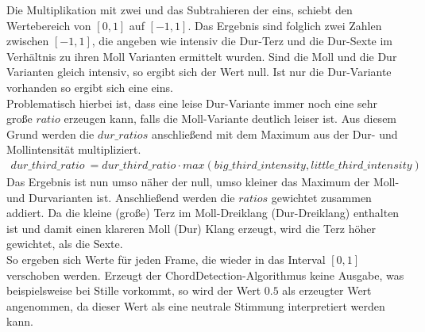 \documentclass[11pt,a4paper]{article}
\begin{document}
\noindent
Die Multiplikation mit zwei und das Subtrahieren der eins, schiebt den Wertebereich von $[0, 1]$ auf $[-1, 1]$. Das Ergebnis sind folglich zwei Zahlen zwischen $[-1, 1]$, die angeben wie intensiv die Dur-Terz und die Dur-Sexte im Verhältnis zu ihren Moll Varianten ermittelt wurden. Sind die Moll und die Dur Varianten gleich intensiv, so ergibt sich der Wert null. Ist nur die Dur-Variante vorhanden so ergibt sich eine eins.\\
Problematisch hierbei ist, dass eine leise Dur-Variante immer noch eine sehr große $ratio$ erzeugen kann, falls die Moll-Variante deutlich leiser ist. Aus diesem Grund werden die $dur\_ratios$ anschließend mit dem Maximum aus der Dur- und Mollintensität multipliziert.
\begin{align}
dur\_third\_ratio\ = dur\_third\_ratio \cdot max(big\_third\_intensity, little\_third\_intensity)
\end{align}
\noindent
Das Ergebnis ist nun umso näher der null, umso kleiner das Maximum der Moll- und Durvarianten ist. Anschließend werden die $ratios$ gewichtet zusammen addiert. Da die kleine (große) Terz im Moll-Dreiklang (Dur-Dreiklang) enthalten ist und damit einen klareren Moll (Dur) Klang erzeugt, wird die Terz höher gewichtet, als die Sexte.\\
So ergeben sich Werte für jeden Frame, die wieder in das Interval $[0, 1]$ verschoben werden. Erzeugt der ChordDetection-Algorithmus keine Ausgabe, was beispielsweise bei Stille vorkommt, so wird der Wert $0.5$ als erzeugter Wert angenommen, da dieser Wert als eine neutrale Stimmung interpretiert werden kann.
\end{document}
